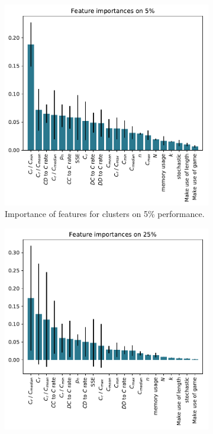 \documentclass{article}
\begin{document}
\begin{figure}[!htbp]
    \begin{subfigure}{0.5\textwidth}
        \begin{center}
            \includegraphics[width=.75\linewidth]{../new_output/noise/_feature_importance_bar_plot_cluster_on_0_05.pdf}
        \end{center}
        \caption{Importance of features for clusters on 5\% performance.}
    \end{subfigure}\hfill
    \begin{subfigure}{0.5\textwidth}
        \begin{center}
            \includegraphics[width=.75\linewidth]{../new_output/noise/_feature_importance_bar_plot_cluster_on_0_25.pdf}

\end{center}
\end{subfigure}
\end{figure}
\end{document}
